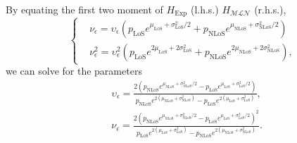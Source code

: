 \documentclass[lettersize,journal]{IEEEtran}
\begin{document}
By equating the first two moment of $H_{\text{Exp}}$ (l.h.s.) $H_{\mathcal{M} \mathcal{L}\mathcal{N}}$ (r.h.s.),
\begin{equation}
  \label{eq:matchingmoments}
  \begin{cases}
    &\nu_{\epsilon} = \upsilon_{\epsilon} \left(p_{\text{LoS}} e^{\mu_{\text{LoS}} + \sigma_{\text{LoS}}^2/2} + p_{\text{NLoS}} e^{\mu_{\text{NLoS}} + \sigma_{\text{NLoS}}^2/2}\right)\\
    &\nu_{\epsilon}^2= \upsilon_{\epsilon}^2 \left( p_{\text{LoS}} e^{2\mu_{\text{LoS}} + 2\sigma_{\text{LoS}}^2} + p_{\text{NLoS}} e^{2\mu_{\text{NLoS}} + 2\sigma_{\text{NLoS}}^2} \right), 
  \end{cases}
\end{equation}
we can solve for the parameters
\begin{align}
  \label{eq:epsilonandupsilon}
    &\upsilon_{\epsilon} = \frac{2\left(p_{\text{NLoS}}e^{\mu_{\text{NLoS}}+\sigma^2_{\text{NLoS}}/2}-p_{\text{LoS}}e^{\mu_{\text{LoS}}+\sigma^2_{\text{LoS}}/2}\right)}{p_{\text{NLoS}}e^{2(\mu_{\text{NLoS}}+\sigma_{\text{NLoS}}^2)}-p_{\text{LoS}}e^{2(\mu_{\text{LoS}}+\sigma_{\text{LoS}}^2)}},\\
    &\nu_{\epsilon}= \frac{ 2\left(p_{\text{NLoS}}e^{\mu_{\text{NLoS}}+\sigma^2_{\text{NLoS}}/2}- p_{\text{LoS}}e^{\mu_{\text{LoS}}+\sigma^2_{\text{LoS}}/2} \right)^2}{p_{\text{LoS}}e^{2(\mu_{\text{LoS}}+\sigma_{\text{LoS}}^2)}-p_{\text{NLoS}}e^{2(\mu_{\text{NLoS}}+\sigma_{\text{NLoS}}^2)}}.
\end{align}



\end{document}
